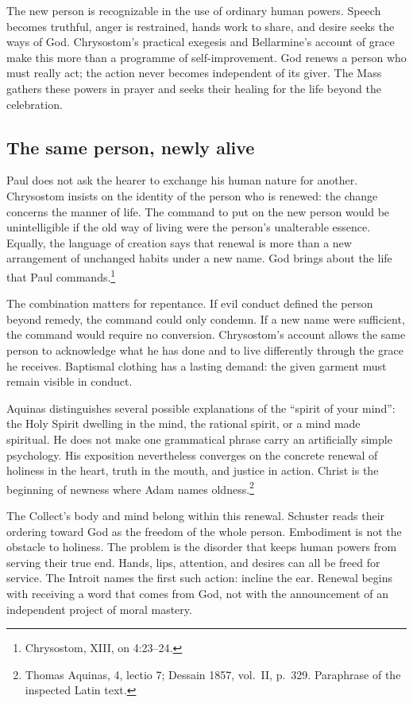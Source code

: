
The new person is recognizable in the use of ordinary human powers.
Speech becomes truthful, anger is restrained, hands work to share,
and desire seeks the ways of God. Chrysostom's practical exegesis
and Bellarmine's account of grace make this more than a programme
of self-improvement. God renews a person who must really act;
the action never becomes independent of its giver. The Mass gathers
these powers in prayer and seeks their healing for the life beyond
the celebration.

\subsection{The same person, newly alive}

Paul does not ask the hearer to exchange his human nature for
another. Chrysostom insists on the identity of the person who is
renewed: the change concerns the manner of life. The command to
put on the new person would be unintelligible if the old way of
living were the person's unalterable essence. Equally, the language
of creation says that renewal is more than a new arrangement of
unchanged habits under a new name. God brings about the life that
Paul commands.\footnote{Chrysostom,  XIII, on
4:23--24.}

The combination matters for repentance. If evil conduct defined
the person beyond remedy, the command could only condemn. If a
new name were sufficient, the command would require no conversion.
Chrysostom's account allows the same person to acknowledge what
he has done and to live differently through the grace he receives.
Baptismal clothing has a lasting demand: the given garment must
remain visible in conduct.

Aquinas distinguishes several possible explanations of the
``spirit of your mind'': the Holy Spirit dwelling in the mind,
the rational spirit, or a mind made spiritual. He does not make
one grammatical phrase carry an artificially simple psychology.
His exposition nevertheless converges on the concrete renewal
of holiness in the heart, truth in the mouth, and justice in
action. Christ is the beginning of newness where Adam names
oldness.\footnote{Thomas Aquinas,  4,
lectio 7; Dessain 1857, vol.~II, p.~329. Paraphrase of the
inspected Latin text.}

The Collect's body and mind belong within this renewal.
Schuster reads their ordering toward God as the freedom of the
whole person. Embodiment is not the obstacle to holiness. The
problem is the disorder that keeps human powers from serving
their true end. Hands, lips, attention, and desires can all be
freed for service. The Introit names the first such action:
incline the ear. Renewal begins with receiving a word that
comes from God, not with the announcement of an independent
project of moral mastery.

